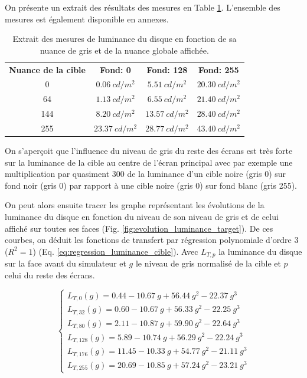 	\par On présente un extrait des résultats des mesures en Table \ref{tab:extrait_mesure_luminance_target}. L'ensemble des mesures est également disponible en annexes.
	
	\begin{table}[h]	
		\centering
		\caption{Extrait des mesures de luminance du disque en fonction de sa nuance de gris et de la nuance globale affichée.}
		\label{tab:extrait_mesure_luminance_target}
		\small
		\begin{tabular}{cccc}
			\textbf{Nuance de la cible} & \textbf{Fond: 0} & \textbf{Fond: 128} & \textbf{Fond: 255}\\
			0 & $0.06~cd/m^2$ & $5.51~cd/m^2$ & $20.30~cd/m^2$\\
			64 & $1.13~cd/m^2$ & $6.55~cd/m^2$ & $21.40~cd/m^2$\\
			144 & $8.20~cd/m^2$ & $13.57~cd/m^2$ & $28.40~cd/m^2$\\
			255 & $23.37~cd/m^2$ & $28.77~cd/m^2$ & $43.40~cd/m^2$
		\end{tabular}
	\end{table}
	
	\par On s'aperçoit que l'influence du niveau de gris du reste des écrans est très forte sur la luminance de la cible au centre de l'écran principal avec par exemple une multiplication par quasiment 300 de la luminance d'un cible noire (gris 0) sur fond noir (gris 0) par rapport à une cible noire (gris 0) sur fond blanc (gris 255).
	
	\par On peut alors ensuite tracer les graphe représentant les évolutions de la luminance du disque en fonction du niveau de son niveau de gris et de celui affiché sur toutes ses faces (Fig. \ref{fig:evolution_luminance_target}). De ces courbes, on déduit les fonctions de transfert par régression polynomiale d'ordre 3 ($R^2 = 1$) (Eq. \ref{eq:regression_luminance_cible}). Avec $L_{T,p}$ la luminance du disque sur la face avant du simulateur et $g$ le niveau de gris normalisé de la cible et $p$ celui du reste des écrans.
	
	\begin{equation}
		\begin{cases}
		L_{T,0}(g) = 0.44 - 10.67~g + 56.44~g^2 - 22.37~g^3\\
		L_{T,32}(g) = 0.60 - 10.67~g + 56.33~g^2 - 22.25~g^3\\
		L_{T,80}(g) = 2.11 - 10.87~g + 59.90~g^2 - 22.64~g^3\\
		L_{T,128}(g) = 5.89 - 10.74~g + 56.29~g^2 - 22.24~g^3\\
		L_{T,176}(g) = 11.45 - 10.33~g + 54.77~g^2 - 21.11~g^3\\
		L_{T,255}(g) = 20.69 - 10.85~g + 57.24~g^2 - 23.21~g^3
		\end{cases}
		\label{eq:regression_luminance_cible}
	\end{equation}
	
